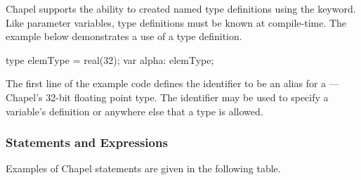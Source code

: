 Chapel supports the ability to created named type definitions using
the  keyword.  Like parameter variables, type definitions
must be known at compile-time.  The example below demonstrates a use of a type
definition.

\begin{chapel}
type elemType = real(32);
var alpha: elemType;
\end{chapel}

The first line of the example code defines the identifier 
 to be
an alias for a ---Chapel's 32-bit floating point type.
The identifier  may be used to specify a variable's
definition or anywhere else that a type is allowed.  

\subsubsection{Statements and Expressions}
\label{Statements_and_Expressions}

Examples of Chapel statements are given in the following table.

